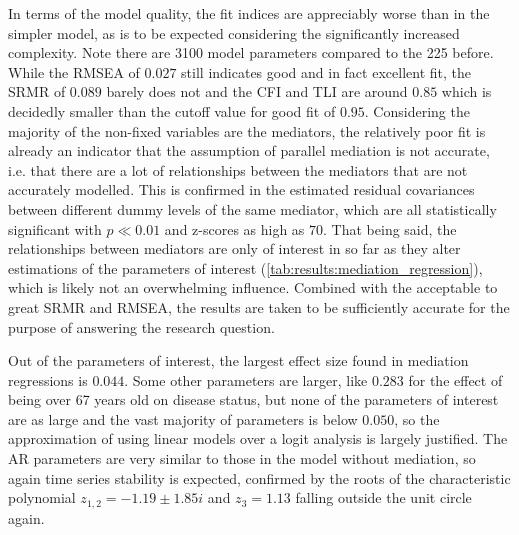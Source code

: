 In terms of the model quality, the fit indices are appreciably worse than in the simpler model, as is to be expected
considering the significantly increased complexity. Note there are 3100 model parameters compared to the 225 before.
While the RMSEA of $0.027$ still indicates good and in fact excellent fit, the SRMR of $0.089$ barely does not and the
CFI and TLI are around $0.85$ which is decidedly smaller than the cutoff value for good fit of $0.95$.
Considering the majority of the non-fixed variables are the mediators, the relatively poor fit is already an indicator
that the assumption of parallel mediation is not accurate,
i.e. that there are a lot of relationships between the mediators that are not accurately modelled.
This is confirmed in the estimated residual covariances between different dummy levels of the same mediator,
which are all statistically significant with $p \ll 0.01$ and z-scores as high as $70$.
That being said, the relationships between mediators are only of interest in so far as they alter estimations
of the parameters of interest (\cref{tab:results:mediation_regression}), which is likely not an overwhelming influence.
Combined with the acceptable to great SRMR and RMSEA, the results are taken to be sufficiently accurate for the
purpose of answering the research question.

Out of the parameters of interest, the largest effect size found in mediation regressions is $0.044$.
Some other parameters are larger, like $0.283$ for the effect of being over 67 years old on disease status,
but none of the parameters of interest are as large and the vast majority of parameters is below $0.050$,
so the approximation of using linear models over a logit analysis is largely justified.
The AR parameters are very similar to those in the model without mediation, so again time series stability is
expected, confirmed by the roots of the characteristic polynomial $z_{1, 2} = -1.19 \pm 1.85i$ and $z_3 = 1.13$
falling outside the unit circle again.


